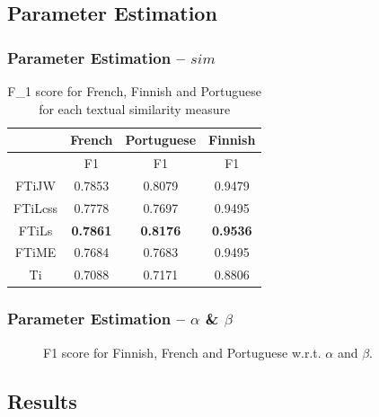\documentclass{beamer}
\begin{document}
\subsection{Parameter Estimation}

\begin{frame}
	\frametitle{Parameter Estimation -- \(sim\)}
	\begin{table}
	{\centering \footnotesize
	\begin{tabular}{|c|c|c|c|}
	\hline &French&Portuguese&Finnish\\
	\hline &F1&F1&F1\\
	\hline FTiJW&0.7853&0.8079&0.9479\\
	\hline FTiLcss&0.7778&0.7697&0.9495\\
	\hline FTiLs&\textbf{0.7861}&\textbf{0.8176}&\textbf{0.9536}\\
	\hline FTiME&0.7684&0.7683&0.9495\\
	\hline Ti&0.7088&0.7171&0.8806\\
	\hline 
	\end{tabular} 
	\caption{\scriptsize F\_1 score for French, Finnish and Portuguese for each textual similarity measure}
	\label{tab:expe1}
	}
	\end{table}
\end{frame}


\begin{frame}
	\frametitle{Parameter Estimation -- \(\alpha\) \& \(\beta\)}
	\begin{figure}\centering

	\caption{\scriptsize F1 score for Finnish, French and Portuguese w.r.t. \(\alpha\) and \(\beta\).}
	\label{fig.1}
	\end{figure}
\end{frame}



\subsection{Results}
\end{document}

